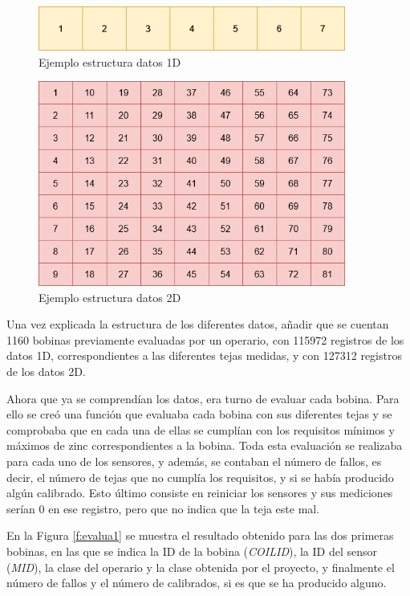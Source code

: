 \begin{figure}[h]
 \centering
  \includegraphics[width=0.9\textwidth]{img/1D.png}
 \caption{Ejemplo estructura datos 1D}
 \label{f:datos1D}
\end{figure}

\begin{figure}[h]
 \centering
  \includegraphics[width=0.9\textwidth]{img/2D.png}
 \caption{Ejemplo estructura datos 2D}
 \label{f:datos2D}
\end{figure}




Una vez explicada la estructura de los diferentes datos, añadir que se cuentan 1160 bobinas previamente evaluadas por un operario, con 115972 registros de los datos 1D, correspondientes a las diferentes tejas medidas, y con 127312 registros de los datos 2D.

Ahora que ya se comprendían los datos, era turno de evaluar cada bobina. Para ello se creó una función que evaluaba cada bobina con sus diferentes tejas y se comprobaba que en cada una de ellas se cumplían con los requisitos mínimos y máximos de zinc correspondientes a la bobina. Toda esta evaluación se realizaba para cada uno de los sensores, y además, se contaban el número de fallos, es decir, el número de tejas que no cumplía los requisitos, y si se había producido algún calibrado. Esto último consiste en reiniciar los sensores y sus mediciones serían 0 en ese registro, pero que no indica que la teja este mal. 

En la Figura \ref{f:evalua1} se muestra el resultado obtenido para las dos primeras bobinas, en las que se indica la ID de la bobina (\emph{COILID}), la ID del sensor (\emph{MID}), la clase del operario y la clase obtenida por el proyecto, y finalmente el número de fallos y el número de calibrados, si es que se ha producido alguno.

